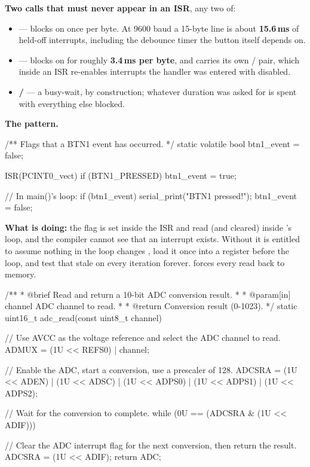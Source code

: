 \textbf{Two calls that must never appear in an ISR}, any two of:
\begin{itemize}
  \item \textbf{} --- blocks on  once per byte. At 9600 baud a
    15-byte line is about \textbf{15.6\,ms} of held-off interrupts, including the debounce timer
    the button itself depends on.
  \item \textbf{} --- blocks on  for roughly \textbf{3.4\,ms per
    byte}, and carries its own / pair, which inside an ISR re-enables
    interrupts the handler was entered with disabled.
  \item \textbf{ / } --- a busy-wait, by construction; whatever
    duration was asked for is spent with everything else blocked.
\end{itemize}

\textbf{The pattern.} 

\begin{ccode}
/** Flags that a BTN1 event has occurred. */
static volatile bool btn1_event = false;

ISR(PCINT0_vect)
{
    if (BTN1_PRESSED) { btn1_event = true; }
}

// In main()'s loop:
if (btn1_event)
{
    serial_print("BTN1 pressed!");
    btn1_event = false;
}
\end{ccode}

\noindent\textbf{What  is doing:} the flag is set inside the ISR and read (and
cleared) inside 's loop, and the compiler cannot see that an interrupt exists. Without
 it is entitled to assume nothing in the loop changes , load it once
into a register before the loop, and test that stale  on every iteration forever.
 forces every read back to memory.


\begin{ccode}
/**
 * @brief Read and return a 10-bit ADC conversion result.
 *
 * @param[in] channel ADC channel to read.
 *
 * @return Conversion result (0-1023).
 */
static uint16_t adc_read(const uint8_t channel)
{
    // Use AVCC as the voltage reference and select the ADC channel to read.
    ADMUX = (1U << REFS0) | channel;

    // Enable the ADC, start a conversion, use a prescaler of 128.
    ADCSRA = (1U << ADEN) | (1U << ADSC) | (1U << ADPS0) | (1U << ADPS1) | (1U << ADPS2);

    // Wait for the conversion to complete.
    while (0U == (ADCSRA & (1U << ADIF))) {}

    // Clear the ADC interrupt flag for the next conversion, then return the result.
    ADCSRA = (1U << ADIF);
    return ADC;
}
\end{ccode}
\noindent{}

